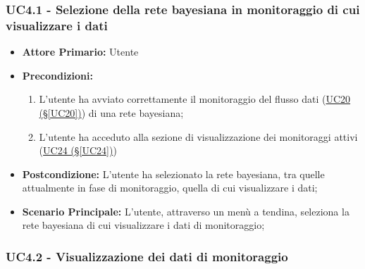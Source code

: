 \pagebreak

\subsubsection{UC4.1 - Selezione della rete bayesiana in monitoraggio di cui visualizzare i dati}\label{UC4.1}

\begin{itemize}
	\item \textbf{Attore Primario:} Utente
	\item \textbf{Precondizioni:} 
	\begin{enumerate}
		\item L'utente ha avviato correttamente il monitoraggio del flusso dati (\hyperref[UC20]{UC20 (§\ref*{UC20})}) di una rete bayesiana;
		\item L'utente ha acceduto alla sezione di visualizzazione dei monitoraggi attivi (\hyperref[UC24]{UC24 (§\ref*{UC24})})
	\end{enumerate}	 
	\item \textbf{Postcondizione:} L'utente ha selezionato la rete bayesiana, tra quelle attualmente in fase di monitoraggio, quella di cui visualizzare i dati;
	\item \textbf{Scenario Principale:} L'utente, attraverso un menù a tendina, seleziona la rete bayesiana di cui visualizzare i dati di monitoraggio;
\end{itemize}

\subsubsection{UC4.2 - Visualizzazione dei dati di monitoraggio}\label{UC4.2}

